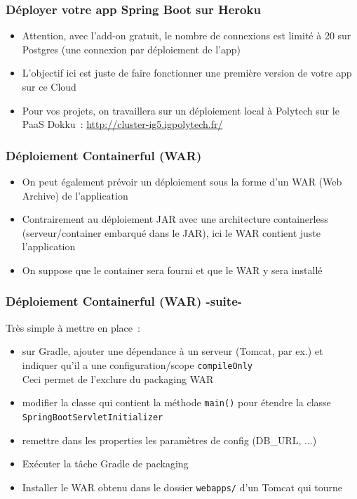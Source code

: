 \documentclass{beamer}
\begin{document}
\begin{frame}
\frametitle{Déployer votre app Spring Boot sur Heroku}
\begin{itemize}			
		\item Attention, avec l'add-on gratuit, le nombre de connexions est limité à 20 sur Postgres (une connexion par déploiement de l'app)
		\item L'objectif ici est juste de faire fonctionner une première version de votre app sur ce Cloud
		\item Pour vos projets, on travaillera sur un déploiement local à Polytech sur le PaaS Dokku~: \url{http://cluster-ig5.igpolytech.fr/}
	\end{itemize}
\end{frame} 

\begin{frame}
	\frametitle{Déploiement Containerful (WAR)}
	\begin{itemize}
		\item On peut également prévoir un déploiement sous la forme d'un WAR (Web Archive) de l'application
		\item Contrairement au déploiement JAR avec une architecture containerless (serveur/container embarqué dans le JAR), ici le WAR contient juste l'application
		\item On suppose que le container sera fourni et que le WAR y sera installé
\end{itemize}
\end{frame} 

\begin{frame}
\frametitle{Déploiement Containerful (WAR) -suite-}
Très simple à mettre en place~:
		\begin{itemize}
			\item sur Gradle, ajouter une dépendance à un serveur (Tomcat, par ex.) et indiquer qu'il a une configuration/scope \texttt{compileOnly}\\
			Ceci permet de l'exclure du packaging WAR
			\item modifier la classe qui contient la méthode \texttt{main()} pour étendre la classe \texttt{SpringBootServletInitializer}
			\item remettre dans les properties les paramètres de config (DB\_URL, ...)
			\item Exécuter la tâche Gradle de packaging
			\item Installer le WAR obtenu dans le dossier \texttt{webapps/} d'un Tomcat qui tourne
		\end{itemize}
\end{frame} 
\end{document}

